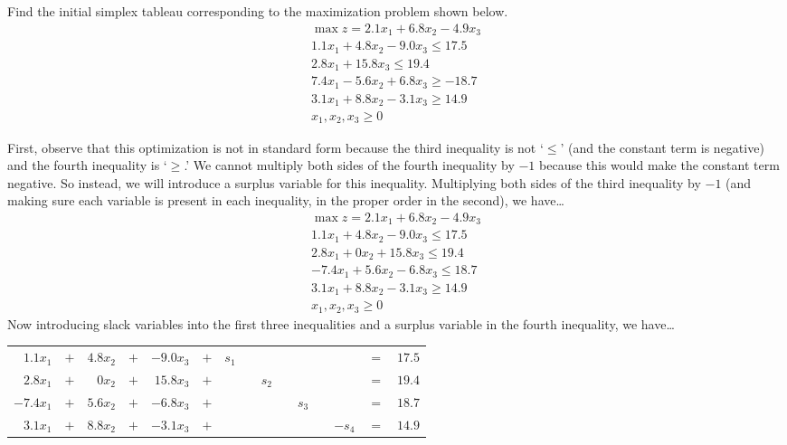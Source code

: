 \documentclass[12pt,letterpaper]{exam}
\begin{document}
\begin{questions}
\newpage
\question[10] Find the initial simplex tableau corresponding to the maximization problem shown below. 
	\[
	\begin{gathered}
	\max z= 2.1x_1 + 6.8x_2 - 4.9x_3 \\
	1.1x_1 + 4.8x_2 - 9.0x_3 \leq 17.5 \\
	2.8x_1 + 15.8x_3 \leq 19.4 \\
	7.4x_1 - 5.6x_2 + 6.8x_3 \geq -18.7 \\
	3.1x_1 + 8.8x_2 - 3.1x_3 \geq 14.9 \\
	x_1, x_2, x_3 \geq 0 
	\end{gathered}
	\] 

{\footnotesize
\sol First, observe that this optimization is not in standard form because the third inequality is not `$\leq$' (and the constant term is negative) and the fourth inequality is `$\geq$.' We cannot multiply both sides of the fourth inequality by $-1$ because this would make the constant term negative. So instead, we will introduce a surplus variable for this inequality. Multiplying both sides of the third inequality by $-1$ (and making sure each variable is present in each inequality, in the proper order in the second), we have\dots 
	\[
	\begin{gathered}
	\max z= 2.1x_1 + 6.8x_2 - 4.9x_3 \\
	1.1x_1 + 4.8x_2 - 9.0x_3 \leq 17.5 \\
	2.8x_1 + 0x_2 + 15.8x_3 \leq 19.4 \\
	-7.4x_1 + 5.6x_2 - 6.8x_3 \leq 18.7 \\
	3.1x_1 + 8.8x_2 - 3.1x_3 \geq 14.9 \\
	x_1, x_2, x_3 \geq 0 
	\end{gathered}
	\] 
Now introducing slack variables into the first three inequalities and a surplus variable in the fourth inequality, we have\dots \par
	\begin{table}[!ht]
	\centering
	\begin{tabular}{rrrrrrrrrrrrrrr}
	$1.1x_1$ & $+$ & $4.8x_2$ & $+$ & $-9.0x_3$ & $+$ & $s_1$ &  &  &  &  &  &  & $=$ & $17.5$ \\
	$2.8x_1$ & $+$ & $0x_2$ & $+$ & $15.8x_3$ & $+$ &  &  & $s_2$ &  &  &  &  & $=$ & $19.4$ \\
	$-7.4x_1$ & $+$ & $5.6x_2$ & $+$ & $-6.8x_3$ & $+$ &  &  &  &  & $s_3$ &  &  & $=$ & $18.7$ \\
	$3.1x_1$ & $+$ & $8.8x_2$ & $+$ & $-3.1x_3$ & $+$ &  &  &  &  &  &  & $-s_4$ & $=$ & $14.9$ 

\end{tabular}
\end{table}}
\end{questions}
\end{document}
